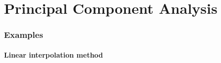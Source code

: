 \chapter{Principal Component Analysis}
\label{chap:pca}


\minitoc




\subsection{Examples}\label{subsec:pca_examples}
\subsubsection{Linear interpolation method}
